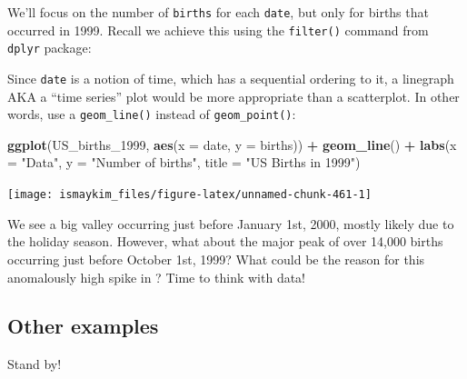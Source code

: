 \documentclass[12pt,]{krantz}
\makeatletter
\newenvironment{Shaded}{\begin{snugshade}}{\end{snugshade}}
\newcommand{\KeywordTok}[1]{\textcolor[rgb]{0.27,0.27,0.27}{\textbf{#1}}}
\newcommand{\DataTypeTok}[1]{\textcolor[rgb]{0.27,0.27,0.27}{#1}}
\newcommand{\DecValTok}[1]{\textcolor[rgb]{0.06,0.06,0.06}{#1}}
\newcommand{\StringTok}[1]{\textcolor[rgb]{0.5,0.5,0.5}{#1}}
\newcommand{\OperatorTok}[1]{\textcolor[rgb]{0.43,0.43,0.43}{\textbf{#1}}}
\newcommand{\NormalTok}[1]{#1}
\newenvironment{kframe}{%
\medskip{}
\setlength{\fboxsep}{.8em}
 \def\at@end@of@kframe{}%
 \ifinner\ifhmode%
  \def\at@end@of@kframe{\end{minipage}}%
  \begin{minipage}{\columnwidth}%
 \fi\fi%
 \def\FrameCommand##1{\hskip\@totalleftmargin \hskip-\fboxsep
 \colorbox{shadecolor}{##1}\hskip-\fboxsep
     \hskip-\linewidth \hskip-\@totalleftmargin \hskip\columnwidth}%
 \MakeFramed {\advance\hsize-\width
   \@totalleftmargin\z@ \linewidth\hsize
   \@setminipage}}%
 {\par\unskip\endMakeFramed%
 \at@end@of@kframe}
\renewenvironment{Shaded}{\begin{kframe}}{\end{kframe}}
\makeatother
\begin{document}
We'll focus on the number of \texttt{births} for each \texttt{date}, but
only for births that occurred in 1999. Recall we achieve this using the
\texttt{filter()} command from \texttt{dplyr} package:

\begin{Shaded}
\end{Shaded}

Since \texttt{date} is a notion of time, which has a sequential ordering
to it, a linegraph AKA a ``time series'' plot would be more appropriate
than a scatterplot. In other words, use a \texttt{geom\_line()} instead
of \texttt{geom\_point()}:

\begin{Shaded}
\begin{Highlighting}[]
\KeywordTok{ggplot}\NormalTok{(US_births_}\DecValTok{1999}\NormalTok{, }\KeywordTok{aes}\NormalTok{(}\DataTypeTok{x =}\NormalTok{ date, }\DataTypeTok{y =}\NormalTok{ births)) }\OperatorTok{+}
\StringTok{  }\KeywordTok{geom_line}\NormalTok{() }\OperatorTok{+}
\StringTok{  }\KeywordTok{labs}\NormalTok{(}\DataTypeTok{x =} \StringTok{"Data"}\NormalTok{, }\DataTypeTok{y =} \StringTok{"Number of births"}\NormalTok{, }\DataTypeTok{title =} \StringTok{"US Births in 1999"}\NormalTok{)}
\end{Highlighting}
\end{Shaded}

\begin{center}\texttt{[image: ismaykim\_files/figure-latex/unnamed-chunk-461-1]} \end{center}

We see a big valley occurring just before January 1st, 2000, mostly
likely due to the holiday season. However, what about the major peak of
over 14,000 births occurring just before October 1st, 1999? What could
be the reason for this anomalously high spike in ? Time to think with
data!

\subsection{Other examples}\label{other-examples}

Stand by!
\end{document}
